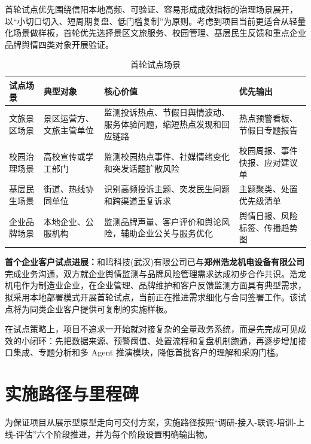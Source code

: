 首轮试点优先围绕信阳本地高频、可验证、容易形成成效指标的治理场景展开，以“小切口切入、短周期复盘、低门槛复制”为原则。考虑到项目当前更适合从轻量化场景做样板，首轮优先选择景区文旅服务、校园管理、基层民生反馈和重点企业品牌舆情四类对象开展验证。

\begin{table}[htbp]
	\centering
	\caption{首轮试点场景}
	\begin{tabularx}{\textwidth}{L{2.6cm}L{3.1cm}Y L{2.8cm}}
		\toprule
		试点场景   & 典型对象         & 核心价值                              & 优先输出            \\
		\midrule
		文旅景区场景 & 景区运营方、文旅主管单位 & 监测投诉热点、节假日舆情波动、服务体验问题，缩短热点发现和回应链路 & 热点预警看板、节假日专题报告  \\
		校园治理场景 & 高校宣传或学工部门    & 监测校园热点事件、社媒情绪变化和突发话题扩散风险          & 校园周报、事件快报、应对建议单 \\
		基层民生场景 & 街道、热线协同单位    & 识别高频投诉主题、突发民生问题和跨渠道重复诉求           & 主题聚类、处置优先级清单    \\
		企业品牌场景 & 本地企业、公服机构    & 监测品牌声量、客户评价和舆论风险，辅助企业公关与服务优化      & 舆情日报、风险标签、传播趋势图 \\
		\bottomrule
	\end{tabularx}
\end{table}

\textbf{首个企业客户试点进展：}和鸣科技(武汉)有限公司已与\textbf{郑州浩龙机电设备有限公司}完成业务沟通，双方就企业舆情监测与品牌风险管理需求达成初步合作共识。浩龙机电作为制造业企业，在企业管理、品牌维护和客户反馈监测方面具有典型需求，拟采用本地部署模式开展首轮试点，当前正在推进需求细化与合同签署工作。该试点将为同类企业客户提供可复制的实施样板。

在试点策略上，项目不追求一开始就对接复杂的全量政务系统，而是先完成可见成效的小闭环：先把数据来源、预警阈值、处置流程和复盘机制跑通，再逐步增加接口集成、专题分析和多 Agent 推演模块，降低首批客户的理解和采购门槛。

\section{实施路径与里程碑}

为保证项目从展示型原型走向可交付方案，实施路径按照“调研-接入-联调-培训-上线-评估”六个阶段推进，并为每个阶段设置明确输出物。

